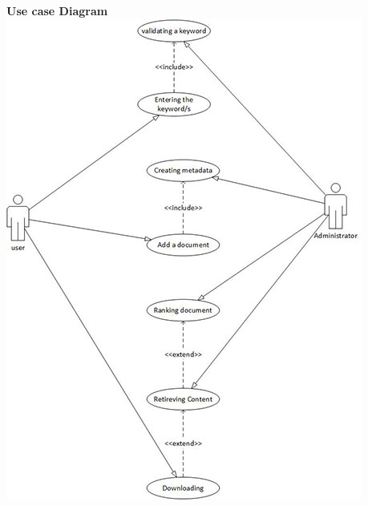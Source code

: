 \documentclass[11pt]{article}
\begin{document}
\newpage
\textbf{Use case Diagram} \\
\includegraphics{use_case_diagram}
\end{document}
